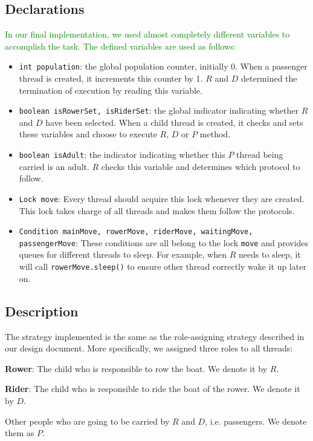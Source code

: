 \documentclass{article}
\begin{document}
\begin{spacing}{1.1}
\subsection{Declarations}
\textcolor{green}{In our final implementation, we used almost completely different variables to accomplish the task. The defined variables are used as follows:}
\begin{itemize}
  \item \texttt{int population}: the global population counter, initially 0. When a passenger thread is created, it increments this counter by 1. $R$ and $D$ determined the termination of execution by reading this variable.\\
  \item \texttt{boolean isRowerSet, isRiderSet}: the global indicator indicating whether $R$ and $D$ have been selected. When a child thread is created, it checks and sets these variables and choose to execute $R$, $D$ or $P$ method.\\
  \item \texttt{boolean isAdult}: the indicator indicating whether this $P$ thread being carried is an adult. $R$ checks this variable and determines which protocol to follow.\\
  \item \texttt{Lock move}: Every thread should acquire this lock whenever they are created. This lock takes charge of all threads and makes them follow the protocols.\\
  \item \texttt{Condition mainMove, rowerMove, riderMove, waitingMove, passengerMove}: These conditions are all belong to the lock \texttt{move} and provides queues for different threads to sleep. For example, when $R$ needs to sleep, it will call \texttt{rowerMove.sleep()} to ensure other thread correctly wake it up later on.\\
\end{itemize}


\subsection{Description}
The strategy implemented is the same as the role-assigning strategy described in our design document. More specifically, we assigned three roles to all threads:
\begin{asparaitem}
  \item \textbf{Rower}: The child who is responsible to row the boat. We denote it by $R$.\\
  \item \textbf{Rider}: The child who is responsible to ride the boat of the rower. We denote it by $D$.\\
  \item Other people who are going to be carried by $R$ and $D$, i.e. passengers. We denote them as $P$.\\
\end{asparaitem}


\end{spacing}
\end{document}
